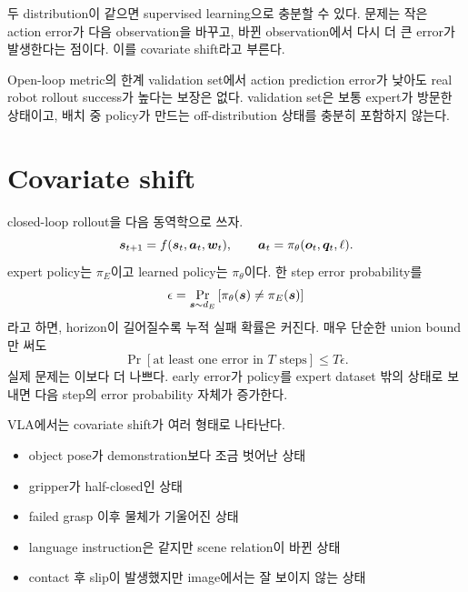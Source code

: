 두 distribution이 같으면 supervised learning으로 충분할 수 있다. 문제는 작은 action error가 다음 observation을 바꾸고, 바뀐 observation에서 다시 더 큰 error가 발생한다는 점이다. 이를 covariate shift라고 부른다.

\begin{warningbox}{Open-loop metric의 한계}
validation set에서 action prediction error가 낮아도 real robot rollout success가 높다는 보장은 없다. validation set은 보통 expert가 방문한 상태이고, 배치 중 policy가 만드는 off-distribution 상태를 충분히 포함하지 않는다.
\end{warningbox}

\section{Covariate shift}

closed-loop rollout을 다음 동역학으로 쓰자.
\begin{equation}
  \bm{s}_{t+1}=f(\bm{s}_t,\bm{a}_t,\bm{w}_t),
  \qquad
  \bm{a}_t=\pi_{\theta}(\bm{o}_t,\bm{q}_t,\ell).
  \label{eq:bc-rollout-dynamics}
\end{equation}
expert policy는 $\pi_E$이고 learned policy는 $\pi_{\theta}$이다. 한 step error probability를
\begin{equation}
  \epsilon
  =
  \Pr_{\bm{s}\sim d_E}
  \left[
  \pi_{\theta}(\bm{s})\ne \pi_E(\bm{s})
  \right]
  \label{eq:one-step-error}
\end{equation}
라고 하면, horizon이 길어질수록 누적 실패 확률은 커진다. 매우 단순한 union bound만 써도
\begin{equation}
  \Pr[\text{at least one error in }T\text{ steps}]
  \le
  T\epsilon.
  \label{eq:error-union-bound}
\end{equation}
실제 문제는 이보다 더 나쁘다. early error가 policy를 expert dataset 밖의 상태로 보내면 다음 step의 error probability 자체가 증가한다.

VLA에서는 covariate shift가 여러 형태로 나타난다.

\begin{itemize}
  \item object pose가 demonstration보다 조금 벗어난 상태
  \item gripper가 half-closed인 상태
  \item failed grasp 이후 물체가 기울어진 상태
  \item language instruction은 같지만 scene relation이 바뀐 상태
  \item contact 후 slip이 발생했지만 image에서는 잘 보이지 않는 상태
\end{itemize}

